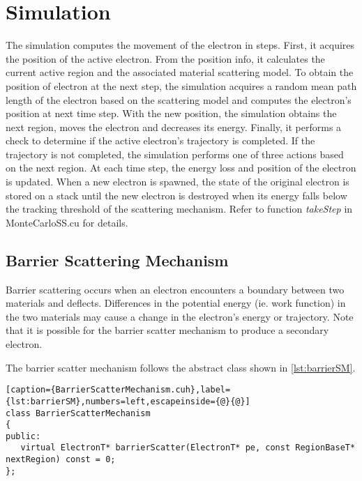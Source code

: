 
\section{Simulation}\label{impl:sim}
The simulation computes the movement of the electron in steps. First, it acquires the position of the active electron. From the position info, it calculates the current active region and the associated material scattering model. To obtain the position of electron at the next step, the simulation acquires a random mean path length of the electron based on the scattering model and computes the electron's position at next time step. With the new position, the simulation obtains the next region, moves the electron and decreases its energy. Finally, it performs a check to determine if the active electron's trajectory is completed. If the trajectory is not completed, the simulation performs one of three actions based on the next region. At each time step, the energy loss and position of the electron is updated. When a new electron is spawned, the state of the original electron is stored on a stack until the new electron is destroyed when its energy falls below the tracking threshold of the scattering mechanism. Refer to function \textit{takeStep} in MonteCarloSS.cu for details. 

\subsection{Barrier Scattering Mechanism}\label{impl:barrier_sm}
Barrier scattering occurs when an electron encounters a boundary between two materials and deflects. Differences in the potential energy (ie. work function) in the two materials may cause a change in the electron's energy or trajectory. Note that it is possible for the barrier scatter mechanism to produce a secondary electron. 

The barrier scatter mechanism follows the abstract class shown in \ref{lst:barrierSM}.

\begin{lstlisting}[caption={BarrierScatterMechanism.cuh},label={lst:barrierSM},numbers=left,escapeinside={@}{@}]
class BarrierScatterMechanism
{
public:
   virtual ElectronT* barrierScatter(ElectronT* pe, const RegionBaseT* nextRegion) const = 0;
};
\end{lstlisting}

